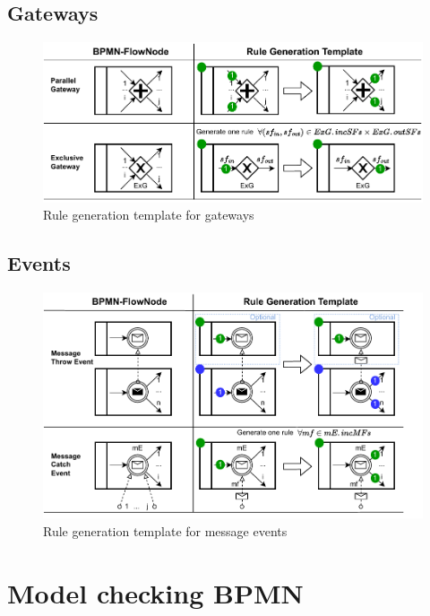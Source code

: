 \documentclass[submission, copyright, creativecommons]{eptcs}
\begin{document}
\subsection{Gateways}
\begin{figure}[h]
    \centering
    \includegraphics[width=1\textwidth]{images/gateways_template.pdf}
    \caption{Rule generation template for gateways}
    \label{fig:GatewayTemplates}
\end{figure}
\subsection{Events}
\begin{figure}[h]
    \centering
    \includegraphics[width=1\textwidth]{images/event_templates.pdf}
    \caption{Rule generation template for message events}
    \label{fig:EventTemplates}
\end{figure}

\section{Model checking BPMN} \label{sec:modelChecking}
\end{document}
